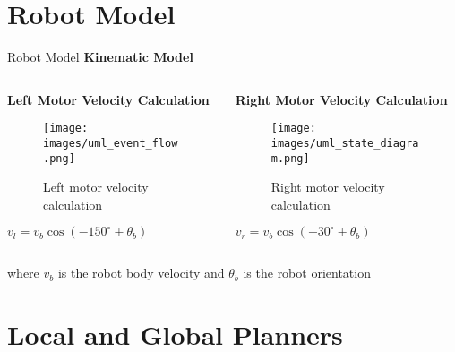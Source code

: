 \documentclass[aspectratio=169]{beamer}
\newcommand{\reducefontsize}{\fontsize{7}{9}\selectfont}
\begin{document}
\section{Robot Model}

\begin{frame}{Robot Model}
	\large{\textbf{Kinematic Model}}
	\vspace{0.3cm}

	\begin{columns}
		\begin{column}{0.5\textwidth}
      {\reducefontsize%
			\textbf{Left Motor Velocity Calculation}
			\begin{figure}
				\centering
				\texttt{[image: images/uml\_event\_flow.png]}
				\caption{Left motor velocity calculation}
			\end{figure}
			\begin{center}
				$v_l = v_b \cos(-150^{\circ} + \theta_b)$
			\end{center}
      }
		\end{column}
		\begin{column}{0.5\textwidth}
      {\reducefontsize%
			\textbf{Right Motor Velocity Calculation}
			\begin{figure}
				\centering
				\texttt{[image: images/uml\_state\_diagram.png]}
				\caption{Right motor velocity calculation}
			\end{figure}
			\begin{center}
				$v_r = v_b \cos(-30^{\circ} + \theta_b)$
			\end{center}
      }
		\end{column}
	\end{columns}

	\vspace{0.5cm}
	\begin{center}
	\end{center}

	\vspace{0.2cm}
	\small{where $v_b$ is the robot body velocity and $\theta_b$ is the robot orientation}
\end{frame}

\section{Local and Global Planners}
\end{document}

